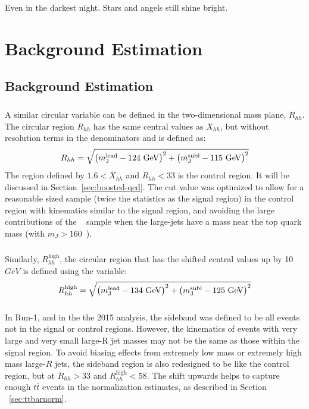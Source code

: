 \begin{savequote}[75mm]
Even in the darkest night. Stars and angels still shine bright.   
\end{savequote}


\chapter{Background Estimation}
\section{Background Estimation}
\label{sec:backgrounds}

\paragraph{}
A similar circular variable can be defined in the two-dimensional mass plane, $R_{hh}$. The circular region $R_{hh}$ has the same central values as $X_{hh}$, but without resolution terms in the denominators and is defined as:
\begin{equation}
\label{eq:boosted_RhhDef}
R_{hh} = \sqrt{\left(m^{\rm lead}_{\rm J} - \text{124 GeV}\right)^2 + \left(m^{\rm subl}_{\rm J} - \text{115 GeV}\right)^2}
\end{equation}
The region defined by $1.6 < X_{hh}$ and $R_{hh} < 33$ is the control region. It will be discussed in Section~\ref{sec:boosted-qcd}.
The cut value was optimized to allow for a reasonable sized sample (twice the statistics as the signal region) in the control region with kinematics similar to the signal region, and avoiding the large contributions of the \ttbar~ sample when the large-\R jets have a mass near the top quark mass (with $m_J > 160$~\GeV).

\paragraph{}
Similarly, $R_{hh}^{\text{high}}$, the circular region that has the shifted central values up by 10 $GeV$ is defined using the variable:\begin{equation}
\label{eq:boosted_RhhhighDef}
R_{hh}^{\text{high}} = \sqrt{\left(m^{\rm lead}_{\rm J} - \text{134 GeV}\right)^2 + \left(m^{\rm subl}_{\rm J} - \text{125 GeV}\right)^2}
\end{equation}

\paragraph{}
In Run-1, and in the the 2015 analysis, the sideband was defined to be all events not in the signal or control regions. However, the kinematics of events with very large and very small large-R jet masses may not be the same as those within the signal region.
To avoid biasing effects from extremely low mass or extremely high mass large-$R$ jets, the sideband region is also redesigned to be like the control region, but at $R_{hh} > 33$ and $R_{hh}^{\text{high}} < 58$.
The shift upwards helps to capture enough $t\bar{t}$ events in the normalization estimates, as described in Section ~\ref{sec:ttbarnorm}.

